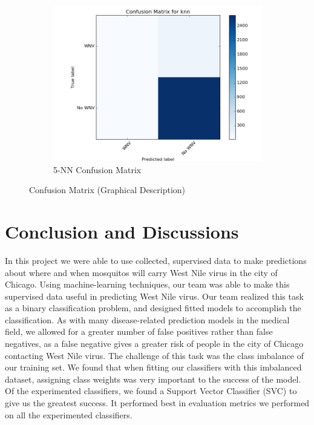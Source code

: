 \documentclass{article} %
\begin{document}
\begin{figure}
\begin{subfigure}[b]{.45\linewidth}
\includegraphics[width=\linewidth]{"img/knn-confusion"}
\caption{5-NN Confusion Matrix}
\end{subfigure}

\caption{Confusion Matrix (Graphical Description)}
\label{img:confusion}
\end{figure}

\section{Conclusion and Discussions}
In this project we were able to use collected, supervised data to make predictions about where and when mosquitos will carry West Nile virus in the city of Chicago.  Using machine-learning techniques, our team was able to make this supervised data useful in predicting West Nile virus.  Our team realized this task as a binary classification problem, and designed fitted models to accomplish the classification.  As with many disease-related prediction models in the medical field, we allowed for a greater number of false positives rather than false negatives, as a false negative gives a greater risk of people in the city of Chicago contacting West Nile virus.  The challenge of this task was the class imbalance of our training set.  We found that when fitting our classifiers with this imbalanced dataset, assigning class weights was very important to the success of the model.  Of the experimented classifiers, we found a Support Vector Classifier (SVC) to give us the greatest success.  It performed best in evaluation metrics we performed on all the experimented classifiers. 
\end{document}
